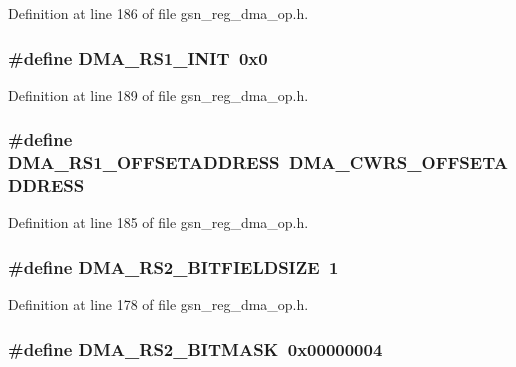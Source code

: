 Definition at line 186 of file gsn\_\-reg\_\-dma\_\-op.h.

\hypertarget{a00547_af8c13a81cc73860bcb15d6a7d4ca16d7}{
\subsubsection[{DMA\_\-RS1\_\-INIT}]{\setlength{\rightskip}{0pt plus 5cm}\#define DMA\_\-RS1\_\-INIT~0x0}}
\label{a00547_af8c13a81cc73860bcb15d6a7d4ca16d7}


Definition at line 189 of file gsn\_\-reg\_\-dma\_\-op.h.

\hypertarget{a00547_aad1b0e86fac1c051f44735132090216a}{
\subsubsection[{DMA\_\-RS1\_\-OFFSETADDRESS}]{\setlength{\rightskip}{0pt plus 5cm}\#define DMA\_\-RS1\_\-OFFSETADDRESS~DMA\_\-CWRS\_\-OFFSETADDRESS}}
\label{a00547_aad1b0e86fac1c051f44735132090216a}


Definition at line 185 of file gsn\_\-reg\_\-dma\_\-op.h.

\hypertarget{a00547_ac22c9357145e1a9f2d4762af98539378}{
\subsubsection[{DMA\_\-RS2\_\-BITFIELDSIZE}]{\setlength{\rightskip}{0pt plus 5cm}\#define DMA\_\-RS2\_\-BITFIELDSIZE~1}}
\label{a00547_ac22c9357145e1a9f2d4762af98539378}


Definition at line 178 of file gsn\_\-reg\_\-dma\_\-op.h.

\hypertarget{a00547_a9217ea018c1d8adea8a815edcc8895cc}{
\subsubsection[{DMA\_\-RS2\_\-BITMASK}]{\setlength{\rightskip}{0pt plus 5cm}\#define DMA\_\-RS2\_\-BITMASK~0x00000004}}
\label{a00547_a9217ea018c1d8adea8a815edcc8895cc}


